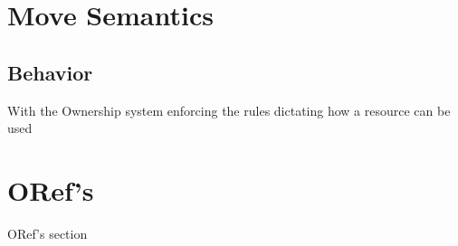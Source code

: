 \documentclass[onehalf,11pt]{beavtex}
\begin{document}
\section{Move Semantics}

\subsection{Behavior}

With the Ownership system enforcing the rules dictating how a resource can be
used

\section{ORef's}
ORef's section




{}

\end{document}
